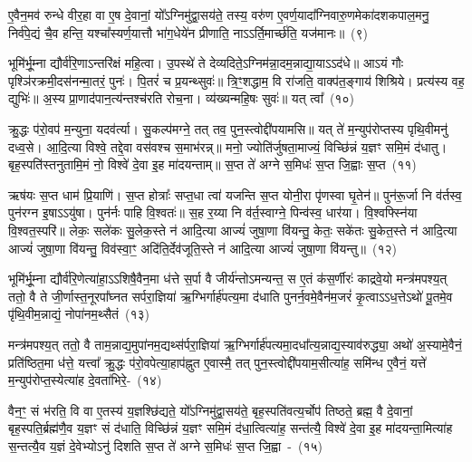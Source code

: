 ए॒वैन॒मव॑ रुन्धे वीर॒हा वा ए॒ष दे॒वानां॒ यो᳚\-ऽग्निमु॑द्वा॒सय॑ते॒ तस्य॒ वरु॑ण ए॒वर्ण॒यादा᳚ग्निवारु॒णमेका॑\-दश\-कपाल॒मनु॒ निर्व॑पे॒द्यं चै॒व हन्ति॒ यश्चा᳚स्यर्ण॒यात्तौ भा॑ग॒धेये॑न प्रीणाति॒ ना\-ऽ\-ऽर्ति॒मार्च्छ॑ति॒ यज॑मानः॥~(९)

{\anuvakamend[{आ\-ऽप॑राभावाय पुरो॒डाश॑मे॒ते आहु॑ती॒ ततः॒ षट्त्रिꣳ॑शच्च}]}%

भूमि॑र्भू॒म्ना द्यौर्व॑रि॒णा\-ऽन्तरि॑क्षं महि॒त्वा। उ॒पस्थे॑ ते देव्यदिते॒\-ऽग्निम॑न्ना॒दम॒न्नाद्या॒या\-ऽ\-ऽद॑धे॥ आ\-ऽयं गौः पृश्ञि॑रक्रमी॒दस॑नन्मा॒तरं॒ पुनः॑। पि॒तरं॑ च प्र॒यन्थ्सुवः॑॥ त्रि॒ꣳ॒शद्धाम॒ वि रा॑जति॒ वाक्प॑त॒ङ्गाय॑ शिश्रिये। प्रत्य॑स्य वह॒ द्युभिः॑॥ अ॒स्य प्रा॒णाद॑पान॒त्य॑न्तश्च॑रति रोच॒ना। व्य॑ख्यन्महि॒षः सुवः॑॥ यत् त्वा᳚~(१०)

क्रु॒द्धः प॑रो॒वप॑ म॒न्युना॒ यदव॑र्त्या। सु॒कल्प॑मग्ने॒ तत् तव॒ पुन॒स्त्वोद्दी॑पयामसि॥ यत् ते॑ म॒न्युप॑रोप्तस्य पृथि॒वीमनु॑ दध्व॒से। आ॒दि॒त्या विश्वे॒ तद्दे॒वा वस॑वश्च स॒माभ॑रन्न्॥ मनो॒ ज्योति॑र्जुषता॒माज्यं॒ विच्छि॑न्नं य॒ज्ञꣳ समि॒मं द॑धातु। बृह॒स्पति॑स्तनुतामि॒मं नो॒ विश्वे॑ दे॒वा इ॒ह मा॑दयन्ताम्॥ स॒प्त ते॑ अग्ने स॒मिधः॑ स॒प्त जि॒ह्वाः स॒प्त~(११)

ऋष॑यः स॒प्त धाम॑ प्रि॒याणि॑। स॒प्त होत्राः᳚ सप्त॒धा त्वा॑ यजन्ति स॒प्त योनी॒रा पृ॑णस्वा घृ॒तेन॑॥ पुन॑रू॒र्जा नि व॑र्तस्व॒ पुन॑रग्न इ॒षा\-ऽ\-ऽयु॑षा। पुन॑र्नः पाहि वि॒श्वतः॑॥ स॒ह र॒य्या नि व॑र्त॒स्वाग्ने॒ पिन्व॑स्व॒ धार॑या। वि॒श्वफ्स्नि॑या वि॒श्वत॒स्परि॑॥ लेकः॒ सले॑कः सु॒लेक॒स्ते न॑ आदि॒त्या आज्यं॑ जुषा॒णा वि॑यन्तु॒ केतः॒ सके॑तः सु॒केत॒स्ते न॑ आदि॒त्या आज्यं॑ जुषा॒णा वि॑यन्तु॒ विव॑स्वा॒ꣳ॒ अदि॑ति॒र्देव॑जूति॒स्ते न॑ आदि॒त्या आज्यं॑ जुषा॒णा वि॑यन्तु॥~(१२)

{\anuvakamend[{त्वा॒ जि॒ह्वाः स॒प्त सु॒केत॒स्ते न॒स्त्रयो॑दश च}]}%

भूमि॑र्भू॒म्ना द्यौर्व॑रि॒णेत्या॑हा॒\-ऽ\-ऽशिषै॒वैन॒मा ध॑त्ते स॒र्पा वै जीर्य॑न्तो\-ऽमन्यन्त॒ स ए॒तं क॑स॒र्णीरः॑ काद्रवे॒यो मन्त्र॑मपश्य॒त् ततो॒ वै ते जी॒र्णास्त॒नूरपा᳚घ्नत सर्परा॒ज्ञिया॑ ऋ॒ग्भिर्गार्\mbox{}ह॑पत्य॒मा द॑धाति पुनर्न॒वमे॒वैन॑म॒जरं॑ कृ॒त्वा\-ऽ\-ऽध॒त्ते\-ऽथो॑ पू॒तमे॒व पृ॑थि॒वीम॒न्नाद्यं॒ नोपा॑नम॒थ्सैतं~(१३)

मन्त्र॑मपश्य॒त् ततो॒ वै ताम॒न्नाद्य॒मुपा॑\-नम॒द्यथ्स॑र्परा॒ज्ञिया॑ ऋ॒ग्भिर्गार्\mbox{}ह॑पत्यमा॒दधा᳚त्य॒न्नाद्य॒स्या\-व॑रुद्ध्या॒ अथो॑ अ॒स्यामे॒वैनं॒ प्रति॑ष्ठित॒मा ध॑त्ते॒ यत्त्वा᳚ क्रु॒द्धः प॑रो॒वपेत्या॒हाप॑ह्नुत ए॒वास्मै॒ तत् पुन॒स्त्वोद्दी॑पयाम॒सीत्या॑ह॒ समि॑न्ध ए॒वैनं॒ यत्ते॑ म॒न्युप॑रोप्त॒स्येत्या॑ह दे॒वता॑भिरे॒-~(१४)

वैन॒ꣳ॒ सं भ॑रति॒ वि वा ए॒तस्य॑ य॒ज्ञश्छि॑द्यते॒ यो᳚\-ऽग्निमु॑द्वा॒सय॑ते॒ बृह॒स्पति॑वत्य॒र्चोप॑ तिष्ठते॒ ब्रह्म॒ वै दे॒वानां॒ बृह॒स्पति॒र्ब्रह्म॑णै॒व य॒ज्ञꣳ सं द॑धाति॒ विच्छि॑न्नं य॒ज्ञꣳ समि॒मं द॑धा॒त्वित्या॑ह॒ सन्त॑त्यै॒ विश्वे॑ दे॒वा इ॒ह मा॑दयन्ता॒मित्या॑ह स॒न्तत्यै॒व य॒ज्ञं दे॒वेभ्यो\-ऽनु॑ दिशति स॒प्त ते॑ अग्ने स॒मिधः॑ स॒प्त जि॒ह्वा~-~(१५)

